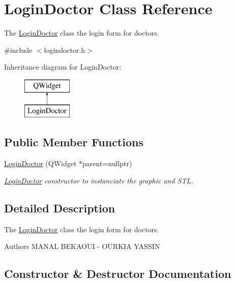 \hypertarget{class_login_doctor}{}\section{Login\+Doctor Class Reference}
\label{class_login_doctor}


The \mbox{\hyperlink{class_login_doctor}{Login\+Doctor}} class the login form for doctors.  




{\ttfamily \#include $<$logindoctor.\+h$>$}

Inheritance diagram for Login\+Doctor\+:\begin{figure}[H]
\begin{center}
\leavevmode
\includegraphics[height=2.000000cm]{class_login_doctor}
\end{center}
\end{figure}
\subsection*{Public Member Functions}
\begin{DoxyCompactItemize}
\item 
\mbox{\hyperlink{class_login_doctor_ab1f2131c0149b5a52b6d82fa0763827f}{Login\+Doctor}} (Q\+Widget $\ast$parent=nullptr)
\begin{DoxyCompactList}\small\item\em \mbox{\hyperlink{class_login_doctor}{Login\+Doctor}} constructor to instanciate the graphic and S\+TL. \end{DoxyCompactList}\end{DoxyCompactItemize}


\subsection{Detailed Description}
The \mbox{\hyperlink{class_login_doctor}{Login\+Doctor}} class the login form for doctors. 

\begin{DoxyAuthor}{Authors}
M\+A\+N\+AL B\+E\+K\+A\+O\+UI -\/ O\+U\+R\+K\+IA Y\+A\+S\+S\+IN 
\end{DoxyAuthor}


\subsection{Constructor \& Destructor Documentation}
\mbox{\label{class_login_doctor_ab1f2131c0149b5a52b6d82fa0763827f}} 
